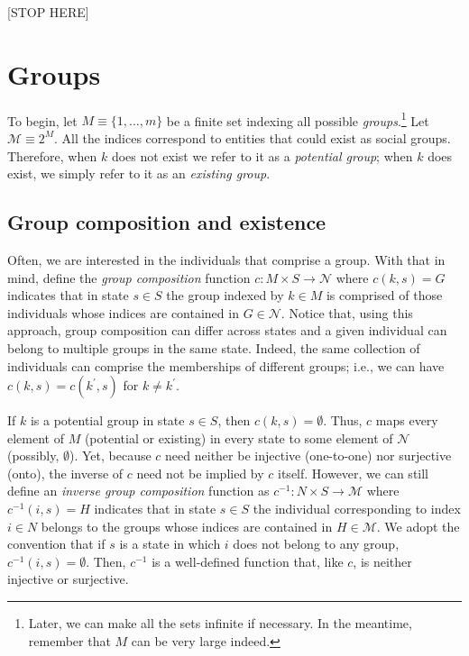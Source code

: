 \documentclass[
11pt,
titlepage,
reqno,
]{article}%
\theoremstyle{definition}
\begin{document}
	
	[STOP HERE]
	
	
	
	\section{Groups}  
	To begin, let $M\equiv \{1,\ldots,m\}$ be a finite set indexing all possible \textit{groups}.\footnote
	{
		Later, we can make all the sets infinite if necessary. In the meantime, remember that $M$ can be very large indeed.	
	} 
	Let  $\mathcal{M}\equiv 2^M$. All the  indices correspond to entities that could exist as social groups. Therefore, when $k$ does not exist we refer to it as a \textit{potential group}; when $k$ does exist, we simply refer to it as  an \textit{existing group}. 
	
	\subsection{Group composition and existence}
	Often, we are interested in the individuals that comprise a group. With that in mind, define the \textit{group composition} function $c:M\times S \rightarrow \mathcal{N}$ where $c(k,s)=G$ indicates that in state $s\in S$ the group indexed by $k\in M$ is comprised of those individuals whose indices are contained in $G\in\mathcal{N}$. Notice that, using this approach, group composition can differ across states and  a given individual can belong to multiple groups in the same state. Indeed, the same collection of individuals can comprise the memberships of different  groups; i.e., we can have $c(k,s)=c(k^\prime,s)$ for $k\ne k^\prime$.
	
	If $k$ is a potential group in state $s\in S$, then $c(k,s)=\emptyset$. Thus, $c$ maps every element of $M$ (potential or existing) in every state to some element of $\mathcal{N}$ (possibly, $\emptyset$). Yet, because $c$ need neither be injective (one-to-one) nor surjective (onto), the inverse of $c$ need not be implied by $c$ itself. However, we can still define an \textit{inverse group composition} function as $c^{-1}:N\times S \rightarrow \mathcal{M}$ where $c^{-1}(i,s)=H$ indicates that in state $s\in S$ the individual corresponding to index $i\in N$ belongs to the groups whose indices are contained in $H\in\mathcal{M}$. We adopt the convention that if $s$ is a state in which $i$ does not belong to any group, $c^{-1}(i,s)=\emptyset$. Then, $c^{-1}$ is a well-defined function that, like $c$, is neither injective or surjective.
	
\end{document}
